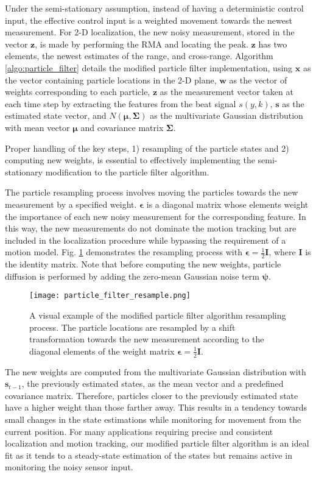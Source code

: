 \documentclass[10pt,journal,final]{IEEEtran}
\begin{document}
Under the semi-stationary assumption, instead of having a deterministic control input, the effective control input is a weighted movement towards the newest measurement. For 2-D localization, the new noisy measurement, stored in the vector $\bm{z}$, is made by performing the RMA and locating the peak. $\bm{z}$ has two elements, the newest estimates of the range, and cross-range. Algorithm \ref{algo:particle_filter} details the modified particle filter implementation, using $\bm{x}$ as the vector containing particle locations in the 2-D plane, $\bm{w}$ as the vector of weights corresponding to each particle, $\bm{z}$ as the measurement vector taken at each time step by extracting the features from the beat signal $s(y,k)$, $\bm{s}$ as the estimated state vector, and $N(\bm{\mu},\bm{\Sigma})$ as the multivariate Gaussian distribution with mean vector $\bm{\mu}$ and covariance matrix $\bm{\Sigma}$.

Proper handling of the key steps, 1) resampling of the particle states and 2) computing new weights, is essential to effectively implementing the semi-stationary modification to the particle filter algorithm. 

The particle resampling process involves moving the particles towards the new measurement by a specified weight. $\bm{\epsilon}$ is a diagonal matrix whose elements weight the importance of each new noisy measurement for the corresponding feature. In this way, the new measurements do not dominate the motion tracking but are included in the localization procedure while bypassing the requirement of a motion model. Fig. \ref{fig:particle_filter} demonstrates the resampling process with $\bm{\epsilon} = \frac{1}{2}\bm{I}$, where $\bm{I}$ is the identity matrix. Note that before computing the new weights, particle diffusion is performed by adding the zero-mean Gaussian noise term $\bm{\psi}$.

\begin{figure}[h]
	\centering
	\texttt{[image: particle\_filter\_resample.png]}
	\caption{A visual example of the modified particle filter algorithm resampling process. The particle locations are resampled by a shift transformation towards the new measurement according to the diagonal elements of the weight matrix $\bm{\epsilon} = \frac{1}{2}\bm{I}$. }
	\label{fig:particle_filter}
\end{figure}

The new weights are computed from the multivariate Gaussian distribution with $\bm{s}_{t-1}$, the previously estimated states, as the mean vector and a predefined covariance matrix. Therefore, particles closer to the previously estimated state have a higher weight than those farther away. This results in a tendency towards small changes in the state estimations while monitoring for movement from the current position. For many applications requiring precise and consistent localization and motion tracking, our modified particle filter algorithm is an ideal fit as it tends to a steady-state estimation of the states but remains active in monitoring the noisy sensor input.
\end{document}
